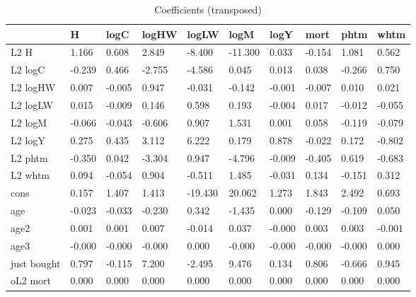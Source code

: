 \begin{table}[htbp]
\caption{\label{clabel} Coefficients (transposed)}\centering\medskip
\begin{tabular}{llllllllll} \hline \hline
 & H  & logC  & logHW  & logLW  & logM  & logY  & mort  & phtm  & whtm  \\  \hline 
L2 H &     1.166 &     0.608 &     2.849 &    -8.400 &   -11.300 &     0.033 &    -0.154 &     1.081 &     0.562 \\  
L2 logC &    -0.239 &     0.466 &    -2.755 &    -4.586 &     0.045 &     0.013 &     0.038 &    -0.266 &     0.750 \\  
L2 logHW &     0.007 &    -0.005 &     0.947 &    -0.031 &    -0.142 &    -0.001 &    -0.007 &     0.010 &     0.021 \\  
L2 logLW &     0.015 &    -0.009 &     0.146 &     0.598 &     0.193 &    -0.004 &     0.017 &    -0.012 &    -0.055 \\  
L2 logM &    -0.066 &    -0.043 &    -0.606 &     0.907 &     1.531 &     0.001 &     0.058 &    -0.119 &    -0.079 \\  
L2 logY &     0.275 &     0.435 &     3.112 &     6.222 &     0.179 &     0.878 &    -0.022 &     0.172 &    -0.802 \\  
L2 phtm &    -0.350 &     0.042 &    -3.304 &     0.947 &    -4.796 &    -0.009 &    -0.405 &     0.619 &    -0.683 \\  
L2 whtm &     0.094 &    -0.054 &     0.904 &    -0.511 &     1.485 &    -0.031 &     0.134 &    -0.151 &     0.312 \\  
cons &     0.157 &     1.407 &     1.413 &   -19.430 &    20.062 &     1.273 &     1.843 &     2.492 &     0.693 \\  
age &    -0.023 &    -0.033 &    -0.230 &     0.342 &    -1.435 &     0.000 &    -0.129 &    -0.109 &     0.050 \\  
age2 &     0.001 &     0.001 &     0.007 &    -0.014 &     0.037 &    -0.000 &     0.003 &     0.003 &    -0.001 \\  
age3 &    -0.000 &    -0.000 &    -0.000 &     0.000 &    -0.000 &    -0.000 &    -0.000 &    -0.000 &     0.000 \\  
just bought &     0.797 &    -0.115 &     7.200 &    -2.495 &     9.476 &     0.134 &     0.806 &    -0.666 &     0.945 \\  
oL2 mort &     0.000 &     0.000 &     0.000 &     0.000 &     0.000 &     0.000 &     0.000 &     0.000 &     0.000 \\  
\hline \hline \end{tabular}
\end{table}
